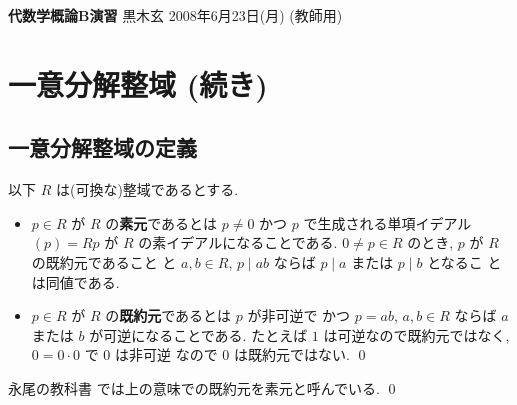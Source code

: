 \documentclass[12pt,twoside]{jarticle}
\newcommand\commentout[1]{#1}
\newcommand\commentout[1]{}
\begin{document}
\noindent
{\Large\bf 代数学概論B演習}
\hfill
{\large 黒木玄}
\qquad
2008年6月23日(月)
\commentout{\quad (教師用)}
\tableofcontents
\setcounter{section}{4}

\section{一意分解整域 (続き)}
\label{sec:UFD}


\subsection{一意分解整域の定義}

以下 $R$ は(可換な)整域であるとする.

\begin{definition}[素元と既約元]
 \quad
 \begin{itemize}
  \item $p\in R$ が $R$ の{\bf 素元}であるとは $p\ne 0$ かつ $p$ 
   で生成される単項イデアル $(p)=Rp$ が $R$ の素イデアルになることである.
   $0\ne p\in R$ のとき, $p$ が $R$ の既約元であること
   と $a,b\in R$, $p\mid ab$ ならば $p\mid a$ または $p\mid b$ となるこ
   とは同値である.
  \item $p\in R$ が $R$ の{\bf 既約元}であるとは $p$ が非可逆で
   かつ $p=ab$, $a,b\in R$ ならば $a$ または $b$ が可逆になることである.
   たとえば $1$ は可逆なので既約元ではなく, $0=0\cdot 0$ で $0$ は非可逆
   なので $0$ は既約元ではない.
   \qed
 \end{itemize}
\end{definition}

\begin{rem}
 永尾の教科書 \cite{nagao} では上の意味での既約元を素元と呼んでいる.
 \qed
\end{rem}
\end{document}
